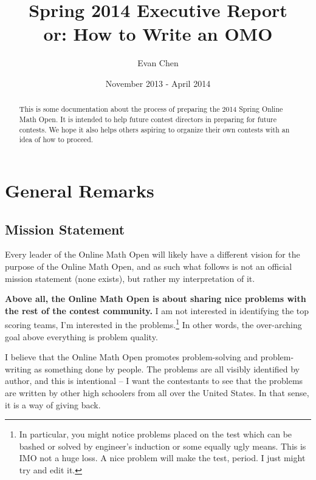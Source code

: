 \documentclass[11pt]{scrreprt}
\begin{document}
\title{Spring 2014 Executive Report \\ or: How to Write an OMO}
\author{Evan Chen}
\date{November 2013 - April 2014}
\maketitle

\begin{abstract}
This is some documentation about the process of preparing the 2014 Spring Online Math Open. It is intended to help future contest directors in preparing for future contests. We hope it also helps others aspiring to organize their own contests with an idea of how to proceed.
\end{abstract}

\tableofcontents

\chapter{General Remarks}
\section{Mission Statement}
Every leader of the Online Math Open will likely have a different vision for the purpose of the Online Math Open, and as such what follows is not an official mission statement (none exists), but rather my interpretation of it.

\textbf{Above all, the Online Math Open is about sharing nice problems with the rest of the contest community.} I am not interested in identifying the top scoring teams, I'm interested in the problems.\footnote{In particular, you might notice problems placed on the test which can be bashed or solved by engineer's induction or some equally ugly means. This is IMO not a huge loss. A nice problem will make the test, period. I just might try and edit it.} In other words, the over-arching goal above everything is problem quality.

I believe that the Online Math Open promotes problem-solving and problem-writing as something done by people.
The problems are all visibly identified by author, and this is intentional -- I want the contestants to see that the problems are written by other high schoolers from all over the United States.
In that sense, it is a way of giving back.
\end{document}
